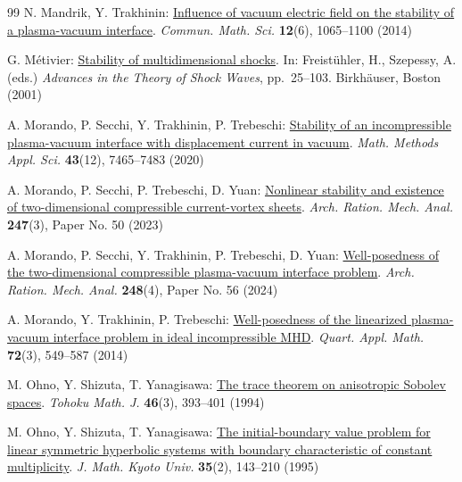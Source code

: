 \documentclass[twoside,11pt]{article}
\numberwithin{equation}{section}
\begin{document}
{\begin{thebibliography}{99}
			  N. Mandrik, Y. Trakhinin: \href{https://doi.org/10.4310/CMS.2014.v12.n6.a4}{Influence of vacuum electric field on the stability of a plasma-vacuum interface}. {\it Commun. Math. Sci.} {\bf 12}(6), 1065--1100 (2014)
			
			 G. M{{\'e}}tivier: \href{https://doi.org/10.1007/978-1-4612-0193-9_2}{Stability of multidimensional shocks}. In: Freist{\"u}hler, H., Szepessy, A. (eds.) {{\it Advances in the Theory of Shock Waves}}, pp.~25--103. Birkh{\"a}user, Boston (2001)
			

 A. Morando, P. Secchi, Y. Trakhinin, P. Trebeschi: \href{https://doi.org/10.1002/mma.6488}{Stability of an incompressible plasma-vacuum interface with displacement current in vacuum}. {\it Math. Methods Appl. Sci.} {\bf 43}(12), 7465--7483 (2020)
			
			 A. Morando, P. Secchi, P. Trebeschi, D. Yuan: \href{https://doi.org/10.1007/s00205-023-01865-w}{Nonlinear stability and existence of two-dimensional compressible current-vortex sheets}. {\it Arch. Ration. Mech. Anal.} {\bf 247}(3), Paper No. 50 (2023)
			
			
			 A. Morando, P. Secchi, Y. Trakhinin, P. Trebeschi, D. Yuan: \href{https://doi.org/10.1007/s00205-024-02001-y}{Well-posedness of the two-dimensional compressible plasma-vacuum interface problem}. {\it Arch. Ration. Mech. Anal.} {\bf 248}(4), Paper No. 56 (2024)
			
  A. Morando, Y. Trakhinin, P. Trebeschi: \href{https://doi.org/10.1090/S0033-569X-2014-01346-7}{Well-posedness of the linearized plasma-vacuum interface problem in ideal incompressible MHD}. {\it Quart. Appl. Math.} {\bf 72}(3), 549--587 (2014)			
			
			 M. Ohno, Y. Shizuta, T. Yanagisawa: \href{https://doi.org/10.2748/tmj/1178225719}{The trace theorem on anisotropic Sobolev spaces}. {\it Tohoku Math. J.} {\bf 46}(3), 393--401 (1994)
			
			 M. Ohno, Y. Shizuta, T. Yanagisawa: \href{https://doi.org/10.1215/kjm/1250518768}{The initial-boundary value problem for linear symmetric hyperbolic systems with boundary characteristic of constant multiplicity}. {\it J. Math. Kyoto Univ.} {\bf 35}(2), 143--210 (1995)
			

\end{thebibliography}}
\end{document}
